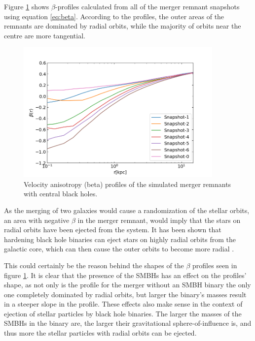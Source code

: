 \documentclass[english, oneside]{HYgradu}
\begin{document}
Figure \ref{figure:beta_no_rb} shows $\beta$-profiles calculated from all of the merger remnant snapshots using equation \ref{eq:beta}. According to the profiles, the outer areas of the remnants are dominated by radial orbits, while the majority of orbits near the centre are more tangential.

\begin{figure}[h]
	\centering
	\includegraphics[width=0.9\textwidth]{beta_no_rb.png}
	\caption{Velocity anisotropy (beta) profiles of the simulated merger remnants with central black holes.}
	\label{figure:beta_no_rb}
\end{figure}


As the merging of two galaxies would cause a randomization of the stellar orbits, an area with negative $\beta$ in the merger remnant, would imply that the stars on radial orbits have been ejected from the system. It has been shown that hardening black hole binaries can eject stars on highly radial orbits from the galactic core, which can then cause the outer orbits to become more radial \citep{Quinlan1997, Milosavljevic2001, Thomas2014}.

This could certainly be the reason behind the shapes of the $\beta$ profiles seen in figure \ref{figure:beta_no_rb}. It is clear that the presence of the SMBHs has an effect on the profiles' shape, as not only is the profile for the merger without an SMBH binary the only one completely dominated by radial orbits, but larger the binary's masses result in a steeper slope in the profile. These effects also make sense in the context of ejection of stellar particles by black hole binaries. The larger the masses of the SMBHs in the binary are, the larger their gravitational sphere-of-influence is, and thus more the stellar particles with radial orbits can be ejected.
\end{document}
